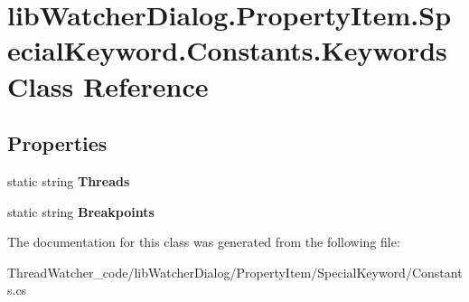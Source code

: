 \hypertarget{classlib_watcher_dialog_1_1_property_item_1_1_special_keyword_1_1_constants_1_1_keywords}{\section{lib\+Watcher\+Dialog.\+Property\+Item.\+Special\+Keyword.\+Constants.\+Keywords Class Reference}
\label{classlib_watcher_dialog_1_1_property_item_1_1_special_keyword_1_1_constants_1_1_keywords}
}
\subsection*{Properties}
\begin{DoxyCompactItemize}
\item 
\hypertarget{classlib_watcher_dialog_1_1_property_item_1_1_special_keyword_1_1_constants_1_1_keywords_af0559e87974f03950295c5cb99ba3f28}{static string {\bfseries Threads}}\label{classlib_watcher_dialog_1_1_property_item_1_1_special_keyword_1_1_constants_1_1_keywords_af0559e87974f03950295c5cb99ba3f28}

\item 
\hypertarget{classlib_watcher_dialog_1_1_property_item_1_1_special_keyword_1_1_constants_1_1_keywords_a7c816ccb8252ec72ef344dfcb7751172}{static string {\bfseries Breakpoints}}\label{classlib_watcher_dialog_1_1_property_item_1_1_special_keyword_1_1_constants_1_1_keywords_a7c816ccb8252ec72ef344dfcb7751172}

\end{DoxyCompactItemize}


The documentation for this class was generated from the following file\+:\begin{DoxyCompactItemize}
\item 
Thread\+Watcher\+\_\+code/lib\+Watcher\+Dialog/\+Property\+Item/\+Special\+Keyword/Constants.\+cs\end{DoxyCompactItemize}
